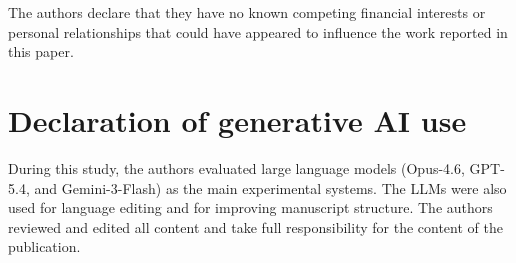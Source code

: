 \documentclass[a4paper,fleqn]{cas-dc}
\begin{document}
{The authors declare that they have no known competing financial interests or personal relationships that could have appeared to influence the work reported in this paper.

\section*{Declaration of generative AI use}

During this study, the authors evaluated large language models (Opus-4.6, GPT-5.4, and Gemini-3-Flash) as the main experimental systems. The LLMs were also used for language editing and for improving manuscript structure. The authors reviewed and edited all content and take full responsibility for the content of the publication.







% 


\clearpage


}
\end{document}
